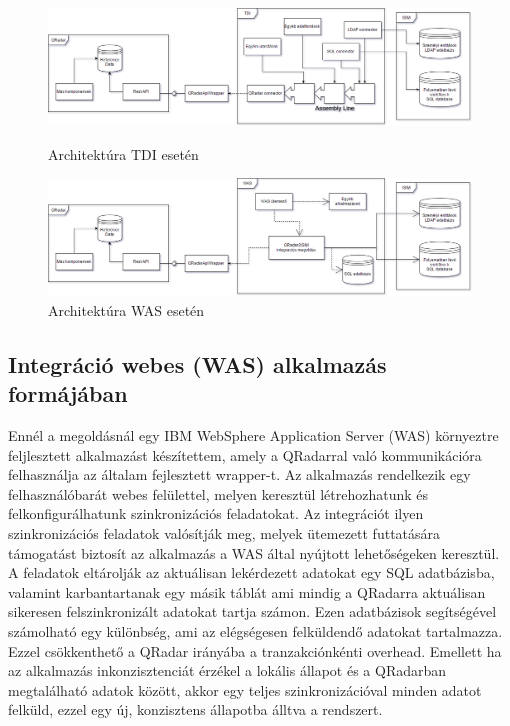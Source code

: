 \begin{figure}[]
	\centering
	\includegraphics[width=1.0\linewidth]{figures/TDI_architecture.png}
	\caption{Architektúra TDI esetén}
	\label{fig:tdi-architecture}
	\includegraphics[width=1.0\linewidth]{figures/WAS_architecture.png}
	\caption{Architektúra WAS esetén}
	\label{fig:wasarchitecture}
\end{figure}


\subsection{Integráció webes (WAS) alkalmazás formájában}

Ennél a megoldásnál egy IBM WebSphere Application Server (WAS) környeztre feljlesztett alkalmazást készítettem, amely a QRadarral való kommunikációra felhasználja az általam fejlesztett wrapper-t. Az alkalmazás rendelkezik egy felhasználóbarát webes felülettel, melyen keresztül létrehozhatunk és felkonfigurálhatunk szinkronizációs feladatokat. Az integrációt ilyen szinkronizációs feladatok valósítják meg, melyek ütemezett futtatására támogatást biztosít az alkalmazás a WAS által nyújtott lehetőségeken keresztül. A feladatok eltárolják az aktuálisan lekérdezett adatokat egy SQL adatbázisba, valamint karbantartanak egy másik táblát ami mindig a QRadarra aktuálisan sikeresen felszinkronizált adatokat tartja számon. Ezen adatbázisok segítségével számolható egy különbség, ami az elégségesen felküldendő adatokat tartalmazza. Ezzel csökkenthető a QRadar irányába a tranzakciónkénti overhead. Emellett ha az alkalmazás inkonzisztenciát érzékel a lokális állapot és a QRadarban megtalálható adatok között, akkor egy teljes szinkronizációval minden adatot felküld, ezzel egy új, konzisztens állapotba álltva a rendszert.

